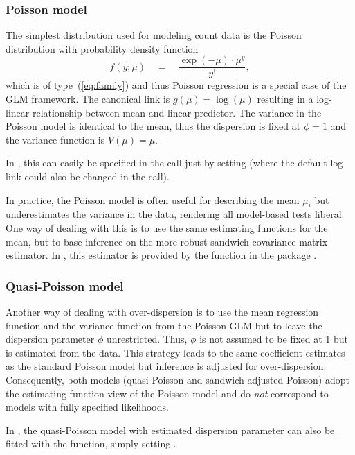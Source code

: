 \documentclass{Z}
\newcommand{\fct}[1]{\code{#1()}}
\begin{document}
\subsubsection{Poisson model}

The simplest distribution used for modeling count data is the 
Poisson distribution with probability density function
\begin{equation} \label{eq:Poisson}
f(y; \mu) \quad = \quad \frac{\exp(-\mu) \cdot \mu^{y}}{y!},
\end{equation}
which is of type~(\ref{eq:family}) and thus Poisson regression
is a special case of the GLM framework. The canonical link is
$g(\mu) = \log(\mu)$ resulting in a log-linear relationship
between mean and linear predictor. The variance in the Poisson
model is identical to the mean, thus the dispersion is
fixed at $\phi = 1$ and the variance function is $V(\mu) = \mu$.

In , this can easily be specified in the \fct{glm} 
call just by setting  (where the default log link
could also be changed in the \fct{poisson} call).

In practice, the Poisson model is often useful for describing the
mean $\mu_i$ but underestimates the variance in the data, rendering
all model-based tests liberal. One way of dealing with this is
to use the same estimating functions for the mean, but to base
inference on the more robust sandwich covariance matrix estimator.
In , this estimator is provided by the \fct{sandwich}
function in the  package \citep{countreg:Zeileis:2004,countreg:Zeileis:2006}.


\subsubsection{Quasi-Poisson model}

Another way of dealing with over-dispersion is to use the mean
regression function and the variance function from the Poisson GLM
but to leave the dispersion parameter $\phi$ unrestricted. Thus,
$\phi$ is not assumed to be fixed at $1$ but is estimated from
the data. This strategy leads
to the same coefficient estimates as the standard Poisson model
but inference is adjusted for over-dispersion. Consequently,
both models (quasi-Poisson and sandwich-adjusted Poisson)
adopt the estimating function view of the Poisson model and
do \emph{not} correspond to models with fully specified likelihoods.

In , the quasi-Poisson model with estimated dispersion
parameter can also be fitted with the \fct{glm} function, simply
setting .
\end{document}

